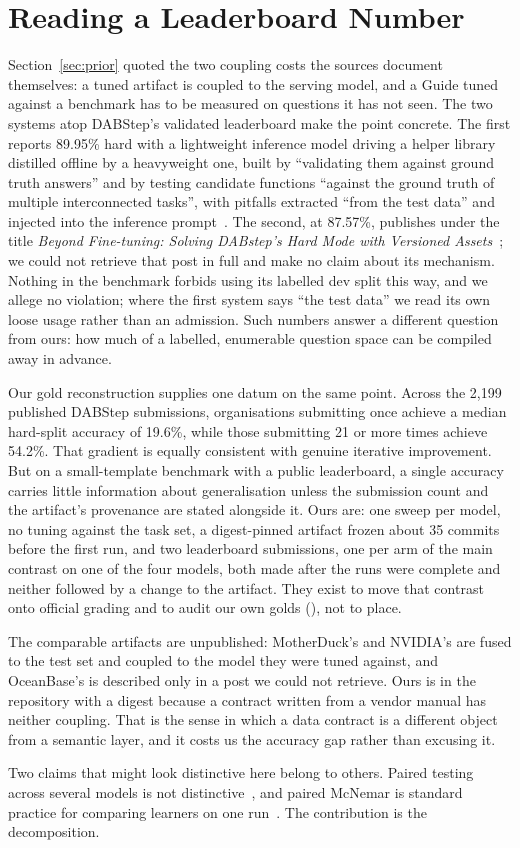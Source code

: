 \section{Reading a Leaderboard Number}
\label{app:leaderboard}

Section~\ref{sec:prior} quoted the two coupling costs the sources document
themselves: a tuned artifact is coupled to the serving model, and a Guide
tuned against a benchmark has to be measured on questions it has not seen.
The two systems atop DABStep's validated leaderboard make the point
concrete. The first reports 89.95\% hard with a lightweight inference
model driving a helper library distilled offline by a heavyweight one, built
by ``validating them against ground truth answers'' and by testing candidate
functions ``against the ground truth of multiple interconnected tasks'',
with pitfalls extracted ``from the test data'' and injected into the
inference prompt~\cite{nvidia-kgmon}. The second, at 87.57\%, publishes under
the title \emph{Beyond Fine-tuning: Solving DABstep's Hard Mode with
Versioned Assets}~\cite{oceanbase-datapilot}; we could not retrieve that post
in full and make no claim about its mechanism. Nothing in the benchmark
forbids using its labelled dev split this way, and we allege no violation;
where the first system says ``the test data'' we read its own loose usage
rather than an admission. Such numbers answer a different question from
ours: how much of a labelled, enumerable question space can be compiled away
in advance.

Our gold reconstruction supplies one datum on the same point. Across the
2{,}199 published DABStep submissions, organisations submitting once achieve
a median hard-split accuracy of 19.6\%, while those submitting 21 or more
times achieve 54.2\%. That gradient is equally consistent with genuine
iterative improvement. But on a small-template benchmark with a public
leaderboard, a single accuracy carries little information about
generalisation unless the submission count and the artifact's provenance
are stated alongside it. Ours are: one sweep per model, no tuning against
the task set, a digest-pinned artifact frozen about 35 commits before the first
run, and two leaderboard submissions, one per arm of the main contrast on
one of the four models, both made after the runs were complete and neither
followed by a change to the artifact. They exist to move that contrast onto
official grading and to audit our own golds (), not
to place.

The comparable artifacts are unpublished: MotherDuck's and NVIDIA's are
fused to the test set and coupled to the model they were tuned against, and
OceanBase's is described only in a post we could not retrieve. Ours is in
the repository with a digest because a contract written from a vendor
manual has neither coupling. That
is the sense in which a data contract is a different object from a semantic
layer, and it costs us the accuracy gap rather than excusing it.

Two claims that might look distinctive here belong to others. Paired testing
across several models is not distinctive~\cite{semantic-paired,dbt-benchmark},
and paired McNemar is standard practice for comparing learners on one
run~\cite{dietterich}. The contribution is the decomposition.
